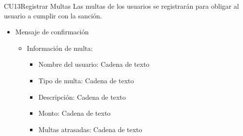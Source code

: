 \begin{UseCase}{CU13}{Registrar Multas}{
	Las multas de los usuarios se registrarán para obligar al usuario a cumplir con la sanción.
	}
{\begin{itemize}
\begin{itemize}
\begin{itemize}
			        		\item Multas atrasadas: Cadena de texto
	    		    		\item Fecha de límite de cumplimiento: Fecha en formato dd/mm/yyyy
	        			\end{itemize}
	     		   \end{itemize}
	        	   \item Mensaje de confirmación
	        	   \begin{itemize}
	        			\item Información de multa:
	        			\begin{itemize}
	        				\item Nombre del usuario: Cadena de texto
	        				\item Tipo de multa: Cadena de texto
		        			\item Descripción: Cadena de texto
		        			\item Monto: Cadena de texto
	    	    			\item Multas atrasadas: Cadena de texto
	        			\end{itemize}
	        		\end{itemize}
	    		\end{itemize}		
		}
	\end{UseCase}
